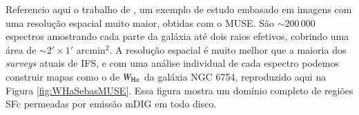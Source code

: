 Referencio aqui o trabalho de \citet{Sanchez.etal.2015MUSE}, um exemplo de estudo embasado em imagens com uma resolução espacial muito maior, obtidas com o MUSE. São $\sim 200\,000$ espectros amostrando cada parte da galáxia até dois raios efetivos, cobrindo uma área de $\sim 2' \times 1'$ arcmin$^2$. A resolução espacial é muito melhor que a maioria dos {\em surveys} atuais de IFS, e com uma análise individual de cada espectro podemos construir mapas como o de $W_{\Ha}$ da galáxia NGC 6754, reproduzido aqui na Figura \ref{fig:WHaSebasMUSE}. Essa figura mostra um domínio completo de regiões SFc permeadas por emissão mDIG em todo disco.

%
